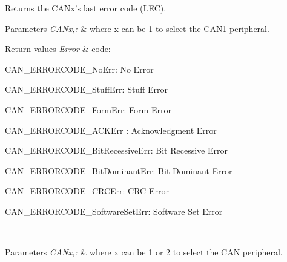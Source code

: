 Returns the C\-A\-Nx's last error code (L\-E\-C). 


\begin{DoxyParams}{Parameters}
{\em C\-A\-Nx,\-:} & where x can be 1 to select the C\-A\-N1 peripheral. \\
\hline
\end{DoxyParams}

\begin{DoxyRetVals}{Return values}
{\em Error} & code\-:
\begin{DoxyItemize}
\item C\-A\-N\-\_\-\-E\-R\-R\-O\-R\-C\-O\-D\-E\-\_\-\-No\-Err\-: No Error
\item C\-A\-N\-\_\-\-E\-R\-R\-O\-R\-C\-O\-D\-E\-\_\-\-Stuff\-Err\-: Stuff Error
\item C\-A\-N\-\_\-\-E\-R\-R\-O\-R\-C\-O\-D\-E\-\_\-\-Form\-Err\-: Form Error
\item C\-A\-N\-\_\-\-E\-R\-R\-O\-R\-C\-O\-D\-E\-\_\-\-A\-C\-K\-Err \-: Acknowledgment Error
\item C\-A\-N\-\_\-\-E\-R\-R\-O\-R\-C\-O\-D\-E\-\_\-\-Bit\-Recessive\-Err\-: Bit Recessive Error
\item C\-A\-N\-\_\-\-E\-R\-R\-O\-R\-C\-O\-D\-E\-\_\-\-Bit\-Dominant\-Err\-: Bit Dominant Error
\item C\-A\-N\-\_\-\-E\-R\-R\-O\-R\-C\-O\-D\-E\-\_\-\-C\-R\-C\-Err\-: C\-R\-C Error
\item C\-A\-N\-\_\-\-E\-R\-R\-O\-R\-C\-O\-D\-E\-\_\-\-Software\-Set\-Err\-: Software Set Error
\end{DoxyItemize}\\
\hline
\end{DoxyRetVals}

\begin{DoxyParams}{Parameters}
{\em C\-A\-Nx,\-:} & where x can be 1 or 2 to select the C\-A\-N peripheral. \\
\hline
\end{DoxyParams}

